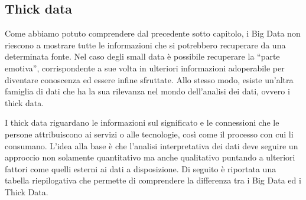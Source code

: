 \subsection{Thick data}

Come abbiamo potuto comprendere dal precedente sotto capitolo, i Big Data non riescono a mostrare tutte le informazioni che si potrebbero recuperare da una determinata fonte. Nel caso degli small data è possibile recuperare la “parte emotiva”, corrispondente a sue volta in ulteriori informazioni adoperabile per diventare conoscenza ed essere infine sfruttate. Allo stesso modo, esiste un'altra famiglia di dati che ha la sua rilevanza nel mondo dell'analisi dei dati, ovvero i thick data.

I thick data riguardano le informazioni sul significato e le connessioni che le persone attribuiscono ai servizi o alle tecnologie, così come il processo con cui li consumano. L'idea alla base è che l'analisi interpretativa dei dati deve seguire un approccio non solamente quantitativo ma anche qualitativo puntando a ulteriori fattori come quelli esterni ai dati a disposizione. Di seguito è riportata una tabella riepilogativa che permette di comprendere la differenza tra i Big Data ed i Thick Data.\cite{big_data_and_thick_data}

